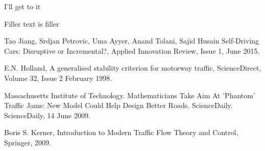 \begin{thebibliography}{9}

	I'll get to it

	Filler text is filler


	Tao Jiang, Srdjan Petrovic, Uma Ayyer, Anand Tolani, Sajid Husain
	Self-Driving Cars: Disruptive or Incremental?,
	Applied Innovation Review,
	Issue 1,
	June 2015.

	E.N. Holland,
	A generalised stability criterion for motorway traffic,
	ScienceDirect,
	Volume 32,
	Issue 2
	February 1998.

	Massachusetts Institute of Technology. 
	Mathematicians Take Aim At 'Phantom' Traffic Jams: New Model Could Help Design Better Roads.
	ScienceDaily. 
	ScienceDaily,
	14 June 2009.

	Boris S. Kerner,
	Introduction to Modern Traffic Flow Theory and Control,
	Springer,
	2009.

\end{thebibliography}
